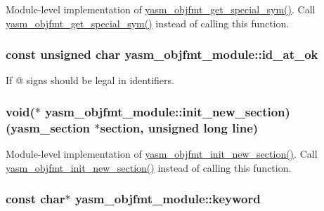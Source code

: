 Module-\/level implementation of \hyperlink{objfmt_8h_a951747cc5297f8084a8281d6c6dddc49}{yasm\-\_\-objfmt\-\_\-get\-\_\-special\-\_\-sym()}. Call \hyperlink{objfmt_8h_a951747cc5297f8084a8281d6c6dddc49}{yasm\-\_\-objfmt\-\_\-get\-\_\-special\-\_\-sym()} instead of calling this function. \hypertarget{structyasm__objfmt__module_ae3e7c7b41312264be6a9d2ff01c668ec}{
\subsubsection[{id\-\_\-at\-\_\-ok}]{\setlength{\rightskip}{0pt plus 5cm}const unsigned char yasm\-\_\-objfmt\-\_\-module\-::id\-\_\-at\-\_\-ok}}\label{structyasm__objfmt__module_ae3e7c7b41312264be6a9d2ff01c668ec}
If @ signs should be legal in identifiers. \hypertarget{structyasm__objfmt__module_a65948c1fefc3f2c8e72bd0f830b3c29f}{
\subsubsection[{init\-\_\-new\-\_\-section}]{\setlength{\rightskip}{0pt plus 5cm}void($\ast$ yasm\-\_\-objfmt\-\_\-module\-::init\-\_\-new\-\_\-section)({\bf yasm\-\_\-section} $\ast$section, unsigned long line)}}\label{structyasm__objfmt__module_a65948c1fefc3f2c8e72bd0f830b3c29f}
Module-\/level implementation of \hyperlink{objfmt_8h_a9667573b424e2cfd6af203c0632aca61}{yasm\-\_\-objfmt\-\_\-init\-\_\-new\-\_\-section()}. Call \hyperlink{objfmt_8h_a9667573b424e2cfd6af203c0632aca61}{yasm\-\_\-objfmt\-\_\-init\-\_\-new\-\_\-section()} instead of calling this function. \hypertarget{structyasm__objfmt__module_a9e510cf4c0c7f848cf8c6d1b13f51036}{
\subsubsection[{keyword}]{\setlength{\rightskip}{0pt plus 5cm}const char$\ast$ yasm\-\_\-objfmt\-\_\-module\-::keyword}}\label{structyasm__objfmt__module_a9e510cf4c0c7f848cf8c6d1b13f51036}
